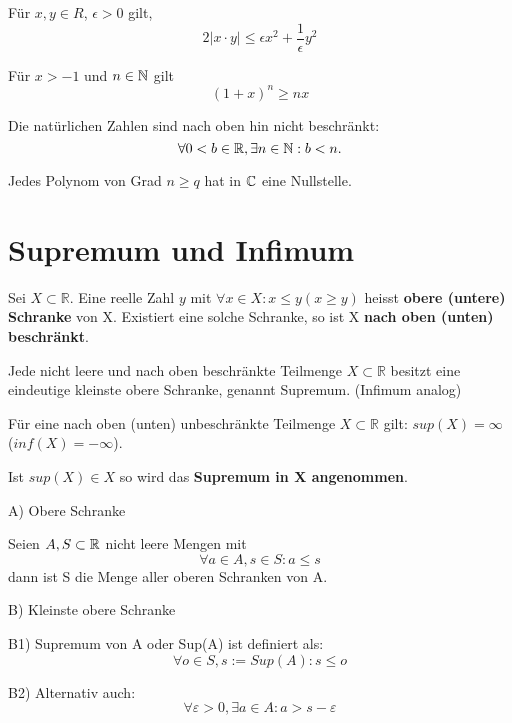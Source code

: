 \begin{theorem}[Young]
Für $x,y \in R$, $ \epsilon > 0$ gilt, \tab
$$
2|x\cdot y| \leq \epsilon x^2 + \frac{1}{\epsilon}y^2
$$
\end{theorem}

\begin{theorem}
Für $x>-1$ und $n\in \mathbb{N}$ gilt
$$(1+x)^n \geq nx$$
\end{theorem}

\begin{definition}
Die natürlichen Zahlen sind nach oben hin nicht beschränkt:
	$$ \forall 0 < b\in \mathbb{R}, \exists n \in \mathbb{N}: b < n.$$
\end{definition}

\begin{theorem}
Jedes Polynom von Grad $n\geq q$ hat in $\mathbb{C}$ eine Nullstelle.
\end{theorem}

\section{Supremum und Infimum}
 	\begin{definition}
    Sei $X \subset \mathbb{R}$.
    Eine reelle Zahl $y$ mit $\forall x \in X: x \leq y (x\geq y)$ heisst \textbf{obere (untere) Schranke} von X.
    Existiert eine solche Schranke, so ist X \textbf{nach oben (unten) beschränkt}.
    \end{definition}
 
 	\begin{definition}
    Jede nicht leere und nach oben beschränkte Teilmenge $X \subset \mathbb{R}$ besitzt eine eindeutige kleinste obere Schranke, genannt Supremum.
    (Infimum analog)
    
	Für eine nach oben (unten) unbeschränkte Teilmenge $X \subset \mathbb{R}$ gilt: $sup(X) = \infty$ ($inf(X) = -\infty$).
    
    Ist $sup(X) \in X$ so wird das \textbf{Supremum in X angenommen}.
	\end{definition}
    
    \begin{concept}
        \item{A) Obere Schranke}

    			\item{} Seien $A, S\subset\mathbb{R}$ nicht leere Mengen mit
    			$$\forall a\in A,s\in S: a\leq s$$ 
				dann ist S die Menge aller oberen Schranken von A.

    \item{B) Kleinste obere Schranke}

    		\item{B1)} Supremum von A oder Sup(A) ist definiert als:
    			$$\forall o \in S, s:= Sup(A): s \leq o$$ 
    		\item{B2)} Alternativ auch: 
    			$$\forall \varepsilon > 0,\exists a\in A:a > s - \varepsilon$$
	\end{concept}
    
